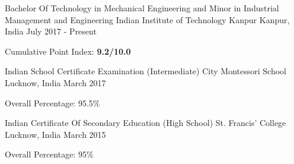 
\begin{cventries}

  \cventry
    {Bachelor Of Technology in Mechanical Engineering and Minor in Industrial Management and Engineering}
    {Indian Institute of Technology Kanpur}
    {Kanpur, India}
    {July 2017 - Present}
    {
      \begin{cvitems}
        \item {Cumulative Point Index: \textbf{9.2/10.0}}
      \end{cvitems}
    }
  
  \cventry
    {Indian School Certificate Examination (Intermediate)}
    {City Montessori School}
    {Lucknow, India}
    {March 2017}
    {
      \begin{cvitems}
        \item {Overall Percentage: 95.5\%}
      \end{cvitems}
    }

  \cventry
    {Indian Certificate Of Secondary Education (High School)}
    {St. Francis' College}
    {Lucknow, India}
    {March 2015}
    {
      \begin{cvitems}
        \item {Overall Percentage: 95\%}
      \end{cvitems}
    }
    
\end{cventries}

